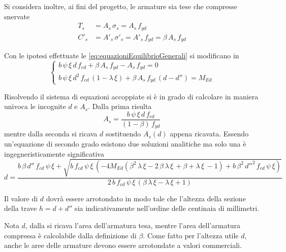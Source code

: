 Si considera inoltre, ai fini del progetto, le armature sia tese che compresse snervate
\begin{align*}
	T_s &= A_s\, \sigma_s = A_s\, f_{yd}\\
	C'_s &= A'_s\,\sigma'_s = A'_s\,f_{yd} = \beta\,A_s\,f_{yd}
\end{align*}

Con le ipotesi effettuate le \eqref{eq:equazioniEquilibrioGenerali} si modificano in 
\begin{equation}
	\label{eq:equazioniEquilibrioProgetto}
	\begin{cases}
		b\,\psi\,\xi\,d\,f_{cd} + \beta\,A_s\,f_{yd} - A_s\,f_{yd} = 0\\
		b\,\psi\,\xi\,d^2\,f_{cd}\,\left(1-\lambda\,\xi\right) + \beta\,A_s\,f_{yd}\,\left(d-d''\right) = M_{Ed}
	\end{cases}
\end{equation}

Risolvendo il sistema di equazioni accoppiate si è in grado di calcolare in maniera univoca le incognite $d$ e $A_s$. Dalla prima risulta
\begin{equation}
    \label{eq:As}
	A_s = \dfrac{b\,\psi\,\xi\,d\,f_{cd}}{(1-\beta)\,f_{yd}}
\end{equation}
mentre dalla seconda si ricava $d$ sostituendo $A_s(d)$ appena ricavata. Essendo un'equazione di secondo grado esistono due soluzioni analitiche ma solo una è ingegneristicamente significativa
\begin{equation} 
    \label{eq:d}
	d = \frac{b\,\beta\,d''\,f_{cd}\,\psi\,\xi + \sqrt{b\,f_{cd}\,\psi\,\xi\, \left(- 4 M_{Ed}\left(\beta^{2}\,\lambda\,\xi -2\,\beta\, \lambda\, \xi\, + \beta + \lambda\, \xi\, -1\right) + b\,\beta^{2}\,d''^{2}\,f_{cd} \,\psi\, \xi\right)}}{2\,b\,f_{cd}\,\psi\, \xi\, \left(\beta\,\lambda\, \xi - \lambda\, \xi + 1\right)}
\end{equation}

Il valore di $d$ dovrà essere arrotondato in modo tale che l'altezza della sezione della trave $h = d+d''$ sia indicativamente nell'ordine delle centinaia di millimetri.

Nota $d$, dalla \label{eq:As} si ricava l'area dell'armatura tesa, mentre l'area dell'armatura compressa è calcolabile dalla definizione di $\beta$. Come fatto per l'altezza utile $d$, anche le aree delle armature devono essere arrotondate a valori commerciali.

